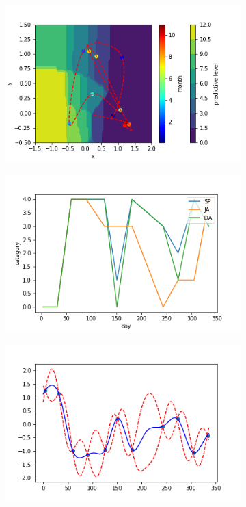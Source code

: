 \documentclass{article}
\begin{document}
\begin{figure}[ht!]
\begin{subfigure}[b]{0.24\textwidth}
	\end{subfigure}
	\begin{subfigure}[b]{0.24\textwidth}
		\includegraphics[width=\textwidth]{pic/year2008_trace}
	\end{subfigure}
	\begin{subfigure}[b]{0.24\textwidth}
		\includegraphics[width=\textwidth]{pic/2009year_cat}
	\end{subfigure}
	\begin{subfigure}[b]{0.24\textwidth}
		\includegraphics[width=\textwidth]{pic/year2009_D0}

\end{subfigure}
\end{figure}
\end{document}
